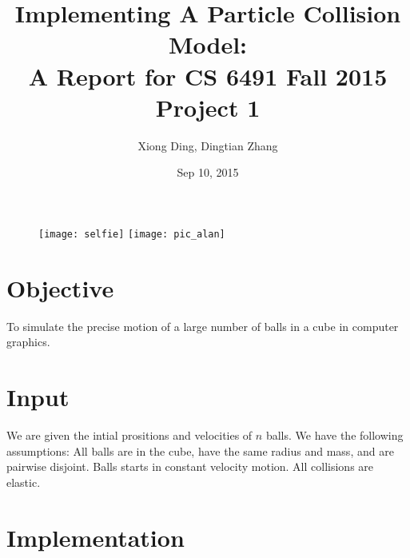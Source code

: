 \documentclass[twoside,10pt]{article}
\begin{document}
\title{Implementing A Particle Collision Model: \\ \large A Report for CS 6491 Fall 2015 Project 1}
\author{Xiong Ding, Dingtian Zhang}
\date{Sep 10, 2015}
\maketitle
\begin{figure} [H]
    \centering
    \texttt{[image: selfie]}
    \texttt{[image: pic\_alan]}
\end{figure}




\section{Objective}

To simulate the precise motion of a large number of balls in a cube in computer graphics. 

\section{Input}
We are given the intial prositions and velocities of $n$ balls. We have the following assumptions: All balls are in the cube, have the same radius and mass, and are pairwise disjoint. Balls starts in constant velocity motion. All collisions are elastic.


\section{Implementation}
\end{document}
